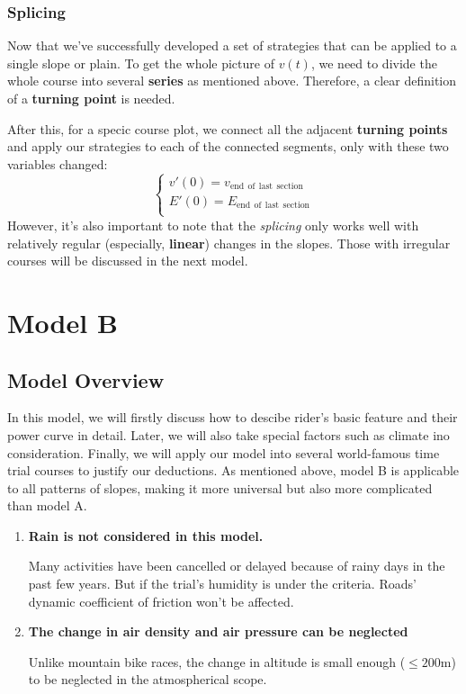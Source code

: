 \documentclass[12pt]{article}
\theoremstyle{definition}
\theoremstyle{remark}
\numberwithin{equation}{section}
\begin{document}
	\subsubsection{Splicing}
			Now that we've successfully developed a set of strategies that can be applied to a single slope or plain. To get the whole picture of $v(t)$, we need to divide the whole course into several \textbf{series} as mentioned above. Therefore, a clear definition of a \textbf{turning point} is needed.

			After this, for a specic course plot, we connect all the adjacent \textbf{turning points} and apply our strategies to each of the connected segments, only with these two variables changed:
			$$
			\left\{ \begin{array}{c}
				v\prime\left( 0 \right) =v_{\mathrm{end}\:\:\mathrm{of}\:\:\mathrm{last}\:\:\mathrm{section}}\\
				E\prime\left( 0 \right) =E_{\mathrm{end}\:\:\mathrm{of}\:\:\mathrm{last}\:\:\mathrm{section}}\\
			\end{array} \right.
			$$
			However, it's also important to note that the \textit{splicing} only works well with relatively regular (especially, \textbf{linear}) changes in the slopes. Those with irregular courses will be discussed in the next model.


	\section{Model B}
	\subsection{Model Overview}
	In this model, we will firstly discuss how to descibe rider's basic feature and their power curve in detail. Later, we will also take special factors such as climate ino consideration. Finally, we will apply our model into several world-famous time trial courses to justify our deductions. As mentioned above, model B is applicable to all patterns of slopes, making it more universal but also more complicated than model A.
	\begin{enumerate}
		\item	\textbf{Rain is not considered in this model.}

				Many activities have been cancelled or delayed because of rainy days in the past few years. But if the trial's humidity is under the criteria. Roads' dynamic coefficient of friction won't be affected.
		\item \textbf{The change in air density and air pressure can be neglected}

				Unlike mountain bike races, the change in altitude is small enough (\(\leq 200\mathrm{m}\)) to be neglected in the atmospherical scope.
	\end{enumerate}
\end{document}
